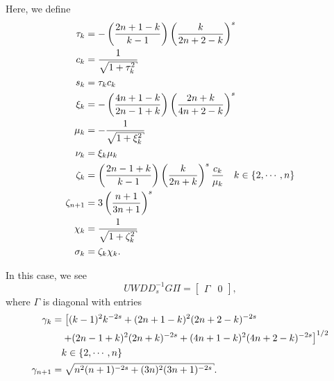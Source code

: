 \noindent
Here, we define
%
\begin{align}
    \tau_{k} &= -\parens{\frac{2n+1-k}{k-1}}
                \parens{\frac{k}{2n+2-k}}^{s} \nonumber\\
    c_{k} &= \frac{1}{\sqrt{1 + \tau_{k}^{2}}} \nonumber\\
    s_{k} &= \tau_{k}c_{k} \nonumber\\
    \xi_{k} &= -\parens{\frac{4n+1-k}{2n-1+k}}
                \parens{\frac{2n+k}{4n+2-k}}^{s} \nonumber\\
    \mu_{k} &= -\frac{1}{\sqrt{1 + \xi_{k}^{2}}} \nonumber\\
    \nu_{k} &= \xi_{k}\mu_{k} \nonumber\\
    \zeta_{k} &= \parens{\frac{2n-1+k}{k-1}}
                \parens{\frac{k}{2n+k}}^{s}\frac{c_{k}}{\mu_{k}}
        \quad k\in\braces{2,\cdots,n} \nonumber\\
    \zeta_{n+1} &= 3\parens{\frac{n+1}{3n+1}}^{s} \nonumber\\
    \chi_{k} &= \frac{1}{\sqrt{1 + \zeta_{k}^{2}}} \nonumber\\
    \sigma_{k} &= \zeta_{k} \chi_{k}.
\end{align}

\noindent
In this case, we see
%
\begin{equation}
    UWDD_{s}^{-1}G\Pi = \begin{bmatrix} \Gamma & 0 \end{bmatrix},
\end{equation}
%
where $\Gamma$ is diagonal with entries
%
\begin{align}
    \gamma_{k} &= \left[
                (k-1)^{2}k^{-2s} + (2n+1-k)^{2}(2n+2-k)^{-2s} \right.
                    \nonumber\\
                &\quad\left. + (2n-1+k)^{2}(2n+k)^{-2s}
                    + (4n+1-k)^{2}(4n+2-k)^{-2s} \right]^{1/2} \nonumber\\
                &\quad
                        k\in\braces{2,\cdots,n} \nonumber\\
    \gamma_{n+1} &= \sqrt{n^{2}(n+1)^{-2s} + (3n)^{2}(3n+1)^{-2s}}.
\end{align}



